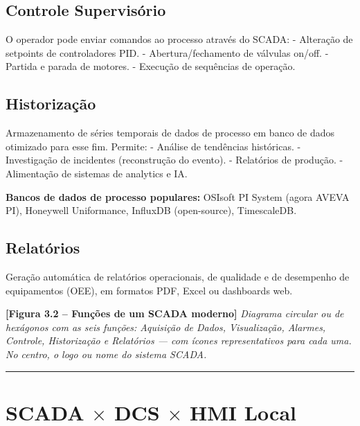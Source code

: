 \subsection{Controle Supervisório}\label{controle-supervisuxf3rio}

O operador pode enviar comandos ao processo através do SCADA:
- Alteração de setpoints de controladores PID.
- Abertura/fechamento de válvulas on/off.
- Partida e parada de motores.
- Execução de sequências de operação.

\subsection{Historização}\label{historizauxe7uxe3o}

Armazenamento de séries temporais de dados de processo em banco de dados otimizado para esse fim. Permite:
- Análise de tendências históricas.
- Investigação de incidentes (reconstrução do evento).
- Relatórios de produção.
- Alimentação de sistemas de analytics e IA.

\textbf{Bancos de dados de processo populares:} OSIsoft PI System (agora AVEVA PI), Honeywell Uniformance, InfluxDB (open-source), TimescaleDB.

\subsection{Relatórios}\label{relatuxf3rios}

Geração automática de relatórios operacionais, de qualidade e de desempenho de equipamentos (OEE), em formatos PDF, Excel ou dashboards web.

\begin{caixafigura}

\textbf{{[}Figura 3.2 -- Funções de um SCADA moderno{]}}
\emph{Diagrama circular ou de hexágonos com as seis funções: Aquisição de Dados, Visualização, Alarmes, Controle, Historização e Relatórios --- com ícones representativos para cada uma. No centro, o logo ou nome do sistema SCADA.}

\end{caixafigura}

\begin{center}\rule{0.5\linewidth}{0.5pt}\end{center}

\section{\texorpdfstring{SCADA \ensuremath{\times} DCS \ensuremath{\times} HMI Local}{SCADA  DCS  HMI Local}}\label{scada-dcs-hmi-local}

